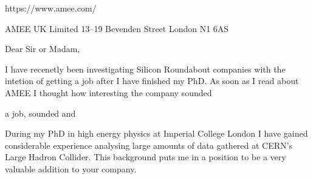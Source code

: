 https://www.amee.com/
\begin{minipage}{0.5\textwidth}
AMEE UK Limited
13--19 Bevenden Street
London
N1 6AS
\vspace{3em}
\end{minipage}




Dear Sir or Madam,






I have recenetly been investigating Silicon Roundabout companies with the intetion of getting a job
after I have finished my PhD.
As soon as I read about AMEE I thought how interesting the company sounded

a job, sounded and

During my PhD in high energy physics at Imperial College London I have gained considerable
experience analysing large amounts of data gathered at CERN's Large Hadron Collider.
This background puts me in a position to be a very valuable addition to your company.


